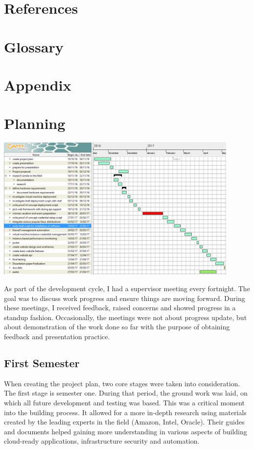 \documentclass{article}
\begin{document}
\newpage
\section{References}


\renewcommand{\bibname}{}

\newpage
\section{Glossary}
\printglossary
\newpage
\section{Appendix}

\section{Planning}

\begin{center}
	\includegraphics[width=12cm]{gantt.jpg}
\end{center}

As part of the development cycle, I had a supervisor meeting every fortnight. The goal was to discuss work progress and ensure things are moving forward. During these meetings, I received feedback, raised concerns and showed progress in a \gls{standup} fashion. Occasionally, the meetings were not about progress update, but about demonstration of the work done so far with the purpose of obtaining feedback and presentation practice.

\subsection{First Semester}
When creating the project plan, two core stages were taken into consideration. The first stage is semester one. During that period, the ground work was laid, on which all future development and testing was based. This was a critical moment into the building process. It allowed for a more in-depth research using materials created by the leading experts in the field (Amazon, Intel, Oracle). Their guides and documents helped gaining more understanding in various aspects of building cloud-ready applications, infrastructure security and automation.
\end{document}
